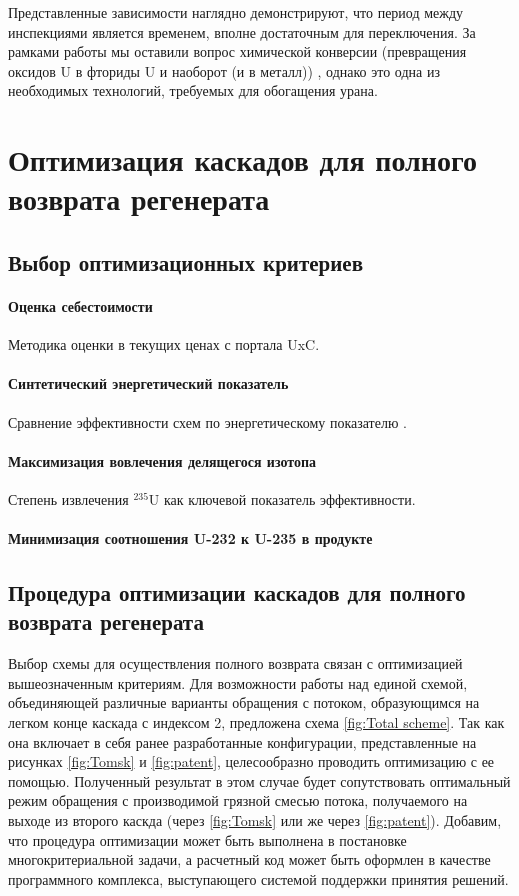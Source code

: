 Представленные зависимости наглядно демонстрируют, что период между инспекциями является временем, вполне достаточным для переключения. За рамками работы мы оставили вопрос химической конверсии (превращения оксидов U в фториды U и наоборот (и в металл)) \cite{orlovDesublimationPurificationTransporting2017}, однако это одна из необходимых технологий, требуемых для обогащения урана. 


\section{Оптимизация каскадов для полного возврата регенерата}\label{sec:ch2/sec5}
\subsection{Выбор оптимизационных критериев}\label{sec:ch2/sec5.1}

\paragraph{Оценка себестоимости}
Методика оценки в текущих ценах с портала UxC.
\paragraph{Синтетический энергетический показатель}
Сравнение эффективности схем по энергетическому показателю \cite{2019}.
\paragraph{Максимизация вовлечения делящегося изотопа}
Степень извлечения $^{235}$U как ключевой показатель эффективности.
\paragraph{Минимизация соотношения U-232 к U-235 в продукте}

\subsection{Процедура оптимизации каскадов для полного возврата регенерата}\label{sec:ch2/sec5.2}
Выбор схемы для осуществления полного возврата связан с оптимизацией вышеозначенным критериям. Для возможности работы над единой схемой, объединяющей различные варианты обращения с потоком, образующимся на легком конце каскада с индексом 2, предложена схема \ref{fig:Total scheme}. Так как она включает в себя ранее разработанные конфигурации, представленные на рисунках \ref{fig:Tomsk} и \ref{fig:patent}, целесообразно проводить оптимизацию с ее помощью. Полученный результат в этом случае будет сопутствовать оптимальный режим обращения с производимой грязной смесью потока, получаемого на выходе из второго каскда (через \ref{fig:Tomsk} или же через \ref{fig:patent}).
Добавим, что процедура оптимизации может быть выполнена в постановке многокритериальной задачи, а расчетный код может быть оформлен в качестве программного комплекса, выступающего системой поддержки принятия решений.

